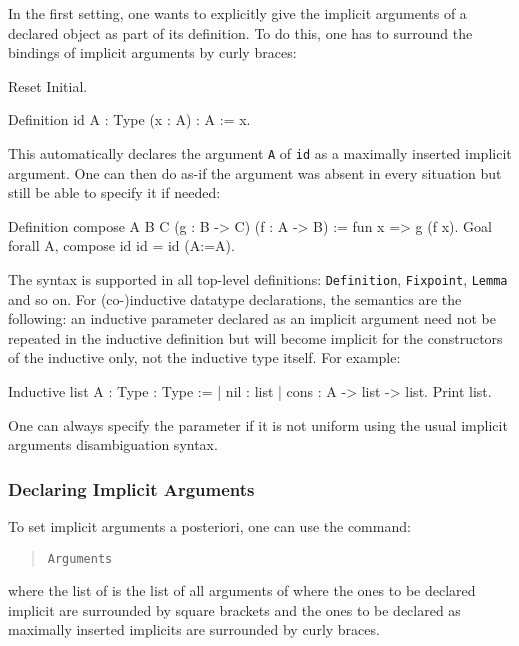 In the first setting, one wants to explicitly give the implicit
arguments of a declared object as part of its definition. To do this, one has
to surround the bindings of implicit arguments by curly braces:
\begin{coq_eval}
Reset Initial.
\end{coq_eval}
\begin{coq_example}
Definition id {A : Type} (x : A) : A := x.
\end{coq_example}

This automatically declares the argument {\tt A} of {\tt id} as a
maximally inserted implicit argument. One can then do as-if the argument
was absent in every situation but still be able to specify it if needed:
\begin{coq_example}
Definition compose {A B C} (g : B -> C) (f : A -> B) := 
  fun x => g (f x).
Goal forall A, compose id id = id (A:=A).
\end{coq_example}

The syntax is supported in all top-level definitions: {\tt Definition},
{\tt Fixpoint}, {\tt Lemma} and so on. For (co-)inductive datatype
declarations, the semantics are the following: an inductive parameter
declared as an implicit argument need not be repeated in the inductive
definition but will become implicit for the constructors of the
inductive only, not the inductive type itself. For example:

\begin{coq_example}
Inductive list {A : Type} : Type :=
| nil : list
| cons : A -> list -> list.
Print list.
\end{coq_example}

One can always specify the parameter if it is not uniform using the
usual implicit arguments disambiguation syntax.

\subsubsection{Declaring Implicit Arguments}

To set implicit arguments a posteriori, one can use the
command:
\begin{quote}
\tt Arguments {\qualid} \nelist{\possiblybracketedident}{}
\end{quote}
where the list of {\possiblybracketedident} is the list of all arguments of
{\qualid} where the ones to be declared implicit are surrounded by
square brackets and the ones to be declared as maximally inserted implicits
are surrounded by curly braces.

